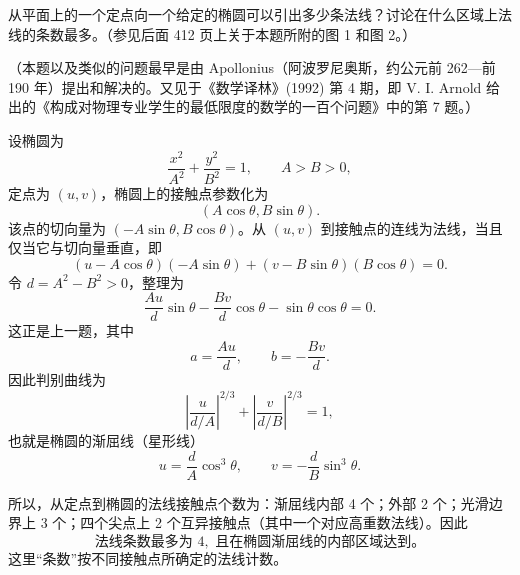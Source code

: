 \begin{xreferenceproblem}[20]
从平面上的一个定点向一个给定的椭圆可以引出多少条法线？讨论在什么区域上法线的条数最多。（参见后面 412 页上关于本题所附的图 1 和图 2。）

  （本题以及类似的问题最早是由 Apollonius（阿波罗尼奥斯，约公元前 262—前 190 年）提出和解决的。又见于《数学译林》(1992) 第 4 期，即 V. I. Arnold 给出的《构成对物理专业学生的最低限度的数学的一百个问题》中的第 7 题。）
\end{xreferenceproblem}
\begin{xsolution}
设椭圆为
\[
  \frac{x^2}{A^2}+\frac{y^2}{B^2}=1,
  \qquad A>B>0,
\]
定点为 $(u,v)$，椭圆上的接触点参数化为
\[
  (A\cos\theta,B\sin\theta).
\]
该点的切向量为 $(-A\sin\theta,B\cos\theta)$。从 $(u,v)$ 到接触点的连线为法线，当且仅当它与切向量垂直，即
\[
  (u-A\cos\theta)(-A\sin\theta)
  +(v-B\sin\theta)(B\cos\theta)=0.
\]
令 $d=A^2-B^2>0$，整理为
\[
  \frac{Au}{d}\sin\theta
  -\frac{Bv}{d}\cos\theta
  -\sin\theta\cos\theta=0.
\]
这正是上一题，其中
\[
  a=\frac{Au}{d},
  \qquad
  b=-\frac{Bv}{d}.
\]
因此判别曲线为
\[
  \left|\frac{u}{d/A}\right|^{2/3}
  +\left|\frac{v}{d/B}\right|^{2/3}=1,
\]
也就是椭圆的渐屈线（星形线）
\[
  u=\frac dA\cos^3\theta,
  \qquad
  v=-\frac dB\sin^3\theta.
\]

所以，从定点到椭圆的法线接触点个数为：渐屈线内部 4 个；外部 2 个；光滑边界上 3 个；四个尖点上 2 个互异接触点（其中一个对应高重数法线）。因此
\[
  \boxed{\text{法线条数最多为 }4,\text{ 且在椭圆渐屈线的内部区域达到。}}
\]
这里“条数”按不同接触点所确定的法线计数。
\end{xsolution}

